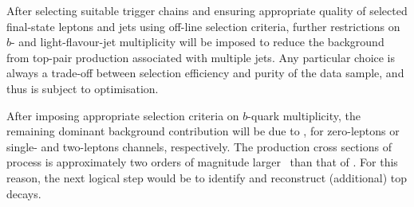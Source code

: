 After selecting suitable trigger chains and ensuring appropriate quality of selected final-state leptons and jets using off-line selection criteria, further restrictions on $b$- and light-flavour-jet multiplicity will be imposed to reduce the background from top-pair production associated with multiple jets. Any particular choice is always a trade-off between selection efficiency and purity of the data sample, and thus is subject to optimisation.

After imposing appropriate selection criteria on $b$-quark multiplicity, the remaining dominant background contribution will be due to \ttbb, for zero-leptons or single- and two-leptons channels, respectively. The production cross sections of \ttbb process is approximately two orders of magnitude larger~\cite{Bevilacqua:2014qfa} than that of \fourtop. For this reason, the next logical step would be to identify and reconstruct (additional) top decays.